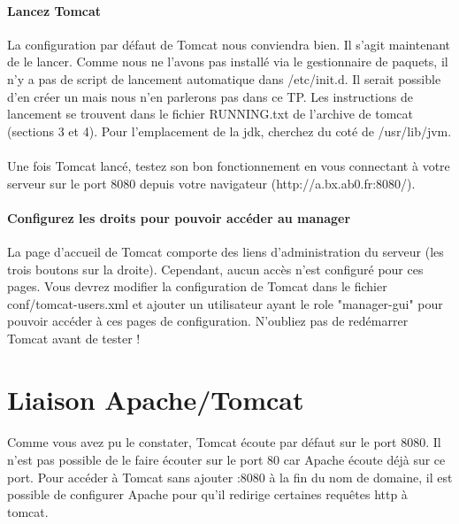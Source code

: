 \documentclass[12pt,a4paper]{article}
\begin{document}
\paragraph{Lancez Tomcat\\}
La configuration par défaut de Tomcat nous conviendra bien. Il s'agit maintenant de le lancer. Comme nous ne l'avons pas installé via le gestionnaire de paquets, il n'y a pas de script de lancement automatique dans /etc/init.d. Il serait possible d'en créer un mais nous n'en parlerons pas dans ce TP. Les instructions de lancement se trouvent dans le fichier RUNNING.txt de l'archive de tomcat (sections 3 et 4). Pour l'emplacement de la jdk, cherchez du coté de /usr/lib/jvm.

\paragraph{}
Une fois Tomcat lancé, testez son bon fonctionnement en vous connectant à votre serveur sur le port 8080 depuis votre navigateur (http://a.bx.ab0.fr:8080/).

\paragraph{Configurez les droits pour pouvoir accéder au manager\\}
La page d'accueil de Tomcat comporte des liens d'administration du serveur (les trois boutons sur la droite). Cependant, aucun accès n'est configuré pour ces pages. Vous devrez modifier la configuration de Tomcat dans le fichier conf/tomcat-users.xml et ajouter un utilisateur ayant le role "manager-gui" pour pouvoir accéder à ces pages de configuration. N'oubliez pas de redémarrer Tomcat avant de tester !

\section{Liaison Apache/Tomcat}

\paragraph{}
Comme vous avez pu le constater, Tomcat écoute par défaut sur le port 8080. Il n'est pas possible de le faire écouter sur le port 80 car Apache écoute déjà sur ce port. Pour accéder à Tomcat sans ajouter :8080 à la fin du nom de domaine, il est possible de configurer Apache pour qu'il redirige certaines requêtes http à tomcat.
\end{document}
